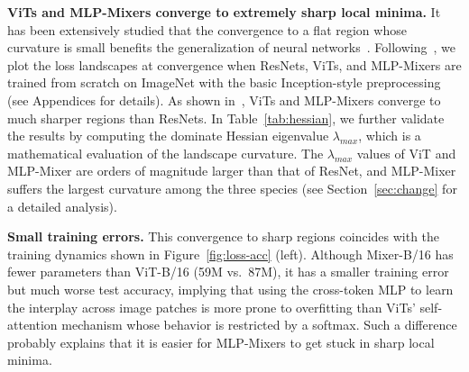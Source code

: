 \documentclass{article}
\newcommand{\BG}[1]{\textcolor{blue}{Boqing: #1}}
\newcommand{\XC}[1]{\textcolor{red}{Xiangning: #1}}
\begin{document}
\textbf{ViTs and MLP-Mixers converge to extremely sharp local minima.} 
It has been extensively studied that the convergence to a flat region whose curvature is small benefits the generalization of neural networks~\cite{keskar2017largebatch, pmlr-v80-kleinberg18a, jastrzebski2018on, pmlr-v119-chen20f, l.2018a, Zela2020Understanding, chaudhari2017entropysgd}. 
Following~\cite{li2018visualize}, we plot the loss landscapes at convergence when ResNets, ViTs, and MLP-Mixers are trained from scratch on ImageNet with the basic Inception-style preprocessing~\cite{szegedy2016inception} (see Appendices for details).
As shown in~, ViTs and MLP-Mixers converge to much sharper regions than ResNets.
In Table~\ref{tab:hessian}, we further validate the results by computing the dominate Hessian eigenvalue $\lambda_{max}$, which is a mathematical evaluation of the landscape curvature.
The $\lambda_{max}$ values of ViT and MLP-Mixer are orders of magnitude larger than that of ResNet, and MLP-Mixer suffers the largest curvature among the three species (see Section~\ref{sec:change} for a detailed analysis).





\textbf{Small training errors.}
This convergence to sharp regions coincides with the training dynamics shown in Figure~\ref{fig:loss-acc} (left).
Although Mixer-B/16 has fewer parameters than ViT-B/16 (59M vs.\ 87M), it has a smaller training error but much worse test accuracy, implying that using the cross-token MLP to learn the interplay across image patches is more prone to overfitting than ViTs' self-attention mechanism whose behavior is restricted by a softmax.
Such a difference probably explains that it is easier for MLP-Mixers to get stuck in sharp local minima. 
\end{document}

